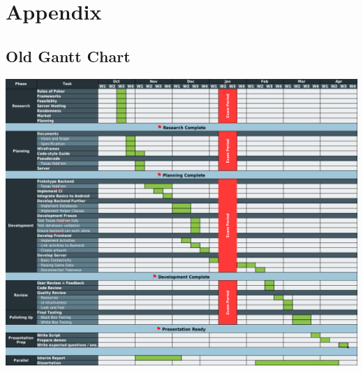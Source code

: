 \documentclass[11pt]{article}
\begin{document}






\newpage

\section{Appendix}

\subsection{Old Gantt Chart}
\includegraphics[width=\textwidth]{gantt_chart}
\end{document}
